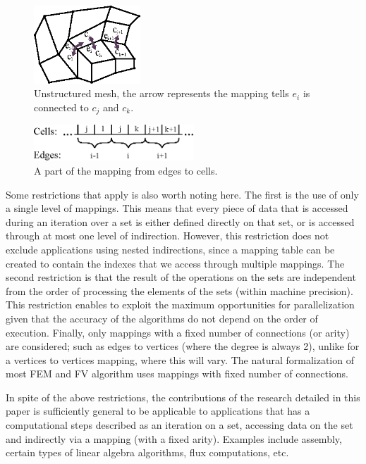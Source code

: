 \begin{figure}
\centering
\includegraphics[width=4cm]{fig/svg/unstructured.eps}
\caption{Unstructured mesh, the arrow represents the mapping tells $e_i$ is
  connected to $c_j$ and $c_k$.}
\label{fig:unstructured}
\end{figure}



\begin{figure}
\centering
\includegraphics[width=6cm]{fig/svg/mapping.eps}
\caption{A part of the mapping from edges to cells.}
\label{fig:mapping}
\end{figure}


Some restrictions that apply is also worth noting here. The first is the use of 
only a single level of mappings. This means that every piece of data that is 
accessed during an iteration over a set is either defined directly on that set, 
or is accessed through at most one level of indirection. However, this 
restriction does not exclude applications using nested indirections, since a 
mapping table can be created to contain the indexes that we access through 
multiple mappings. The second restriction is that the result of the operations 
on the sets are independent from the order of processing the elements of the 
sets (within machine precision). This restriction enables to exploit the 
maximum opportunities for parallelization given that the accuracy of the 
algorithms do not depend on the order of execution. Finally, only  mappings with 
a fixed number of connections (or arity) are considered; such as edges to 
vertices (where the degree is always 2), unlike for a vertices to vertices 
mapping, where this will vary. The natural formalization of most FEM and FV 
algorithm uses mappings with fixed number of connections.

In spite of the above restrictions, the contributions of the research detailed 
in this paper is sufficiently general to be applicable to applications that has 
a computational steps described as an iteration on a set, accessing data on the 
set and indirectly via a mapping (with a fixed arity). Examples include 
assembly, certain types of linear algebra algorithms, flux computations, etc.
